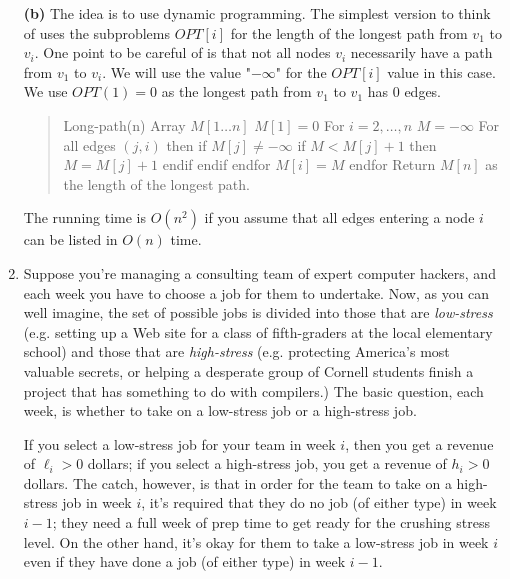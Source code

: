 \documentclass[12pt]{article}
\def\opt{{OPT}}
\def\opt{{OPT}}
\begin{document}
\begin{enumerate}
{{\bf (b)}
The idea is to use dynamic programming. The simplest version to think of uses 
the subproblems $\opt[i]$ for the length of the longest path from $v_1$ 
to $v_i$. One point to be careful of is that not all nodes $v_i$ 
necessarily have a 
path from $v_1$ to $v_i$. We will use the value "$-\infty$" for the 
$\opt[i]$ value in this case. We use $\opt(1)=0$ as the longest
path from $v_1$ to $v_1$ has $0$ edges.

\begin{quote}
\begin{code}
Long-path(n)
  Array $M[1\ldots n]$
  $M[1]=0$
  For $i=2,\ldots,n$
     $M=-\infty$
     For all edges $(j,i)$ then
        if $M[j] \neq -\infty$
             if $M < M[j]+1$ then
                 $M=M[j]+1$
             endif
        endif
     endfor
     $M[i]=M$
  endfor
  Return $M[n]$ as the length of the longest path.
\end{code}
\end{quote}

The running time is $O(n^2)$ if you assume that all edges entering a node $i$
can be listed in $O(n)$ time.

}


\item

Suppose you're managing a consulting team of expert computer hackers,
and each week you have to choose a job for them to undertake.
Now, as you can well imagine, the set of possible jobs
is divided into those that are {\em low-stress}
(e.g. setting up a Web site for a class of fifth-graders
at the local elementary school)
and those that are {\em high-stress}
(e.g. protecting America's most valuable secrets,
or helping a desperate group of Cornell students 
finish a project that has something to do with compilers.)
The basic question, each week, is whether to
take on a low-stress job or a high-stress job.

If you select a low-stress job for your team
in week $i$, then you get a revenue of $\ell_i > 0$ dollars;
if you select a high-stress job, you get a revenue
of $h_i > 0$ dollars.
The catch, however, is that in order for the team
to take on a high-stress job in week $i$,
it's required that they do no job (of either type)
in week $i-1$;
they need a full week of prep time to get ready for
the crushing stress level.
On the other hand, it's okay for them to take
a low-stress job in week $i$ even if they have
done a job (of either type) in week $i-1$.


\end{enumerate}
\end{document}
